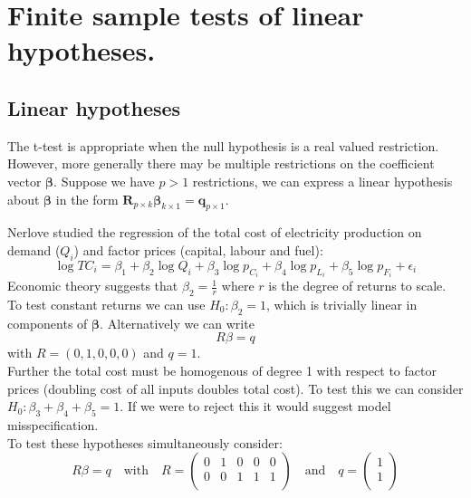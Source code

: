 \documentclass[DIV=14,titlepage=false]{scrreprt}
\begin{document}
\vspace{-10pt}
\setcounter{chapter}{4}
\chapter{Finite sample tests of linear hypotheses.}
\vspace{-10pt}
\section{Linear hypotheses}
The t-test is appropriate when the null hypothesis is a real valued restriction. However, more generally there may be multiple restrictions on the coefficient vector $\boldsymbol{\beta}$. Suppose we have $p>1$ restrictions, we can express a linear hypothesis about $\boldsymbol{\beta}$ in the form $\boldsymbol{R}_{p \times k}\boldsymbol{\beta}_{k \times 1}=\boldsymbol{q}_{p \times 1}$.

\begin{example}
    Nerlove studied the regression of the total cost of electricity production on demand ($Q_i$) and factor prices (capital, labour and fuel):
    \[ \log TC_i = \beta_1 + \beta_2 \log Q_i + \beta_3 \log p_{C_i} + \beta_4 \log p_{L_i}+ \beta_5 \log p_{F_i} + \epsilon_i \]
    Economic theory suggests that $\beta_2=\frac{1}{r}$ where $r$ is the degree of returns to scale. To test constant returns we can use $H_0: \beta_2=1$, which is trivially linear in components of $\boldsymbol{\beta}$. Alternatively we can write \[R\beta=q\] with $R=(0,1,0,0,0)$ and $q=1$.\\
    Further the total cost must be homogenous of degree 1 with respect to factor prices (doubling cost of all inputs doubles total cost). To test this we can consider $H_0: \beta_3 + \beta_4 +\beta_5 =1$. If we were to reject this it would suggest model misspecification.\\
    To test these hypotheses simultaneously consider:
    \[
        R\beta = q \quad \text{with} \quad R = \begin{pmatrix}
        0 & 1 & 0 & 0 & 0 \\
        0 & 0 & 1 & 1 & 1 \\
        \end{pmatrix}
        \quad \text{and} \quad q = \begin{pmatrix}
        1 \\
        1 \\
        \end{pmatrix}
        \]
\end{example}
\end{document}
